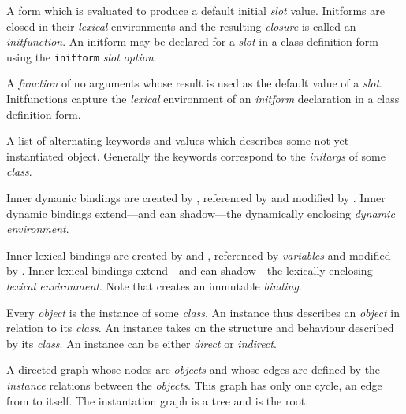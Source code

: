 \begin{optDefinition}
\begin{definitions}
      A form which is evaluated to
    produce a default initial {\em slot} value.  Initforms are closed in their
    {\em lexical} environments and the resulting {\em closure} is called an {\em
        initfunction}.  An initform may be declared for a {\em slot} in a class
    definition form using the {\tt initform} {\em slot} {\em option}.

      A {\em function} of
    no arguments whose result is used as the default value of a {\em slot}.
    Initfunctions capture the {\em lexical} environment of an {\em initform}
    declaration in a class definition form.

      A list of alternating
    keywords and values which describes some not-yet instantiated object.
    Generally the keywords correspond to the {\em initargs} of some {\em class}.

     Inner dynamic
    bindings are created by , referenced by
     and modified by .  Inner
    dynamic bindings extend---and can shadow---the dynamically enclosing {\em
        dynamic environment}.

     Inner lexical
    bindings are created by  and , referenced by {\em
        variables} and modified by .  Inner lexical bindings
    extend---and can shadow---the lexically enclosing {\em lexical environment}.
    Note that  creates an immutable {\em binding}.

      Every {\em object} is the
    instance of some {\em class}.  An instance thus describes an {\em object} in
    relation to its {\em class}.  An instance takes on the structure and
    behaviour described by its {\em class}.  An instance can be either {\em
        direct} or {\em indirect}.

      A
    directed graph whose nodes are {\em objects} and whose edges are defined by
    the {\em instance} relations between the {\em objects}.  This graph has only
    one cycle, an edge from  to itself.  The instantation graph is
    a tree and  is the root.


\end{definitions}
\end{optDefinition}
